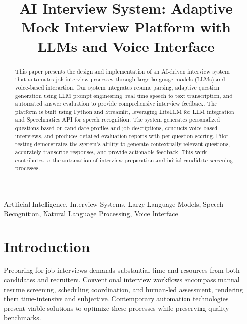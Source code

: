 \documentclass[conference]{IEEEtran}
\begin{document}
\title{AI Interview System: Adaptive Mock Interview Platform with LLMs and Voice Interface}

\author{
}

\maketitle

\begin{abstract}
This paper presents the design and implementation of an AI-driven interview system that automates job interview processes through large language models (LLMs) and voice-based interaction. Our system integrates resume parsing, adaptive question generation using LLM prompt engineering, real-time speech-to-text transcription, and automated answer evaluation to provide comprehensive interview feedback. The platform is built using Python and Streamlit, leveraging LiteLLM for LLM integration and Speechmatics API for speech recognition. The system generates personalized questions based on candidate profiles and job descriptions, conducts voice-based interviews, and produces detailed evaluation reports with per-question scoring. Pilot testing demonstrates the system's ability to generate contextually relevant questions, accurately transcribe responses, and provide actionable feedback. This work contributes to the automation of interview preparation and initial candidate screening processes.
\end{abstract}

\begin{IEEEkeywords}
Artificial Intelligence, Interview Systems, Large Language Models, Speech Recognition, Natural Language Processing, Voice Interface
\end{IEEEkeywords}

\section{Introduction}

Preparing for job interviews demands substantial time and resources from both candidates and recruiters. Conventional interview workflows encompass manual resume screening, scheduling coordination, and human-led assessment, rendering them time-intensive and subjective. Contemporary automation technologies present viable solutions to optimize these processes while preserving quality benchmarks.
\end{document}
